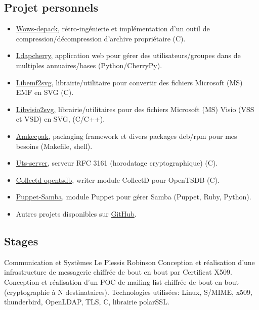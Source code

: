 \documentclass[10pt,a4paper,sans]{moderncv}        %
\begin{document}
\subsection{Projet personnels}
        {}
        {}
        {}
        {
            \begin{itemize}
            \item \href{https://github.com/wows-tools/wows-depack}{Wows-depack}, rétro-ingénierie et implémentation d'un outil de compression/décompression d'archive propriétaire (C).
            \item \href{https://github.com/kakwa/ldapcherry}{Ldapcherry}, application web pour gérer des utilisateurs/groupes dans de multiples annuaires/bases (Python/CherryPy).
            \item \href{https://github.com/kakwa/libemf2svg}{Libemf2svg}, librairie/utilitaire pour convertir des fichiers Microsoft (MS) EMF en SVG (C).
            \item \href{https://github.com/kakwa/libvisio2svg}{Libvisio2svg}, librairie/utilitaires pour des fichiers Microsoft (MS) Visio (VSS et VSD) en SVG, (C/C++).
            \item \href{https://github.com/kakwa/amkecpak}{Amkecpak}, packaging framework et divers packages deb/rpm pour mes besoins (Makefile, shell).
            \item \href{https://github.com/kakwa/uts-server}{Uts-server}, serveur RFC 3161 (horodatage cryptographique) (C).
            \item \href{https://github.com/kakwa/collectd-opentsdb}{Collectd-opentsdb}, writer module CollectD pour OpenTSDB (C).
            \item \href{https://github.com/kakwa/puppet-samba}{Puppet-Samba}, module Puppet pour gérer Samba (Puppet, Ruby, Python).
            \item Autres projets disponibles sur \href{https://github.com/kakwa?tab=repositories&q=&type=&language=&sort=stargazers}{GitHub}.
            \end{itemize}
        }

\subsection{Stages}

        {Communication et Systèmes}
        {Le Plessis Robinson}
        {}
        {Conception et réalisation d'une infrastructure de messagerie chiffrée de bout en bout par
         Certificat X509. Conception et réalisation d'un POC de mailing list chiffrée de bout en bout
         (cryptographie à N destinataires).
         \newline Technologies utilisées: Linux, S/MIME, x509, thunderbird, OpenLDAP, TLS, C, librairie polarSSL.
        }
\end{document}
